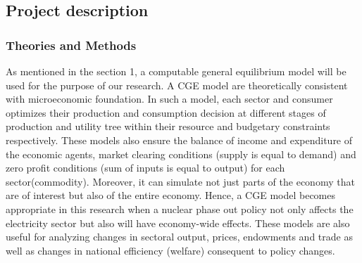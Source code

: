 \documentclass[10pt,a4paper]{article}
\begin{document}
\begin{comment}
Nuclear safety and waste disposal.: Number of people surrounding nuclear power plant at 30 km radius.
Current political situation regarding nuclear phase out in Sweden: What current government says and what its opposition parties says
To represent the government plan,
To represent the opposition parties plan,
Potential role of hydropower, renewable and carbon capture and sequestration.
Current energy status of Sweden.
Considering the nuclear power to be phase out, and the possibility of substituting it by relatively in expensive technique of fossil fuel power is excluded due to CO2 commitment and hydropower development is restricted due to its capacity, then the price and supply of electricity will most certainly be affected.

To expand hydroelectric power or to revert to importing oil and gas to substitute for nuclear energy are hardly options for an environmentally conscious state like Sweden. Moreover, replacing nuclear power with renewable energy sources is not currently a realistic option.

The purpose of this research is to examine the effects of different policy scenarios with respect to Swedish energy policy, specifically issues concerning a nuclear phase-out and restrictions on CO2 emissions.

\end{comment}



\subsection{Project description}
\subsubsection{Theories and Methods}
As mentioned in the section 1, a computable general equilibrium model will be used for the purpose of our research. A CGE model are theoretically consistent with microeconomic foundation. In such a model, each sector and consumer optimizes their production and consumption decision at different stages of production and utility tree within their resource and budgetary constraints respectively. These models also ensure the balance of income and expenditure of the economic agents, market clearing conditions (supply is equal to demand) and zero profit conditions (sum of inputs is equal to output) for each sector(commodity). Moreover, it can simulate not just parts of the economy that are of interest but also of the entire economy. Hence, a CGE model becomes appropriate in this research when a nuclear phase out policy not only affects the electricity sector but also will have economy-wide effects. These models are also useful for analyzing changes in sectoral output, prices, endowments and trade as well as changes in national efficiency (welfare) consequent to policy changes.
\end{document}
